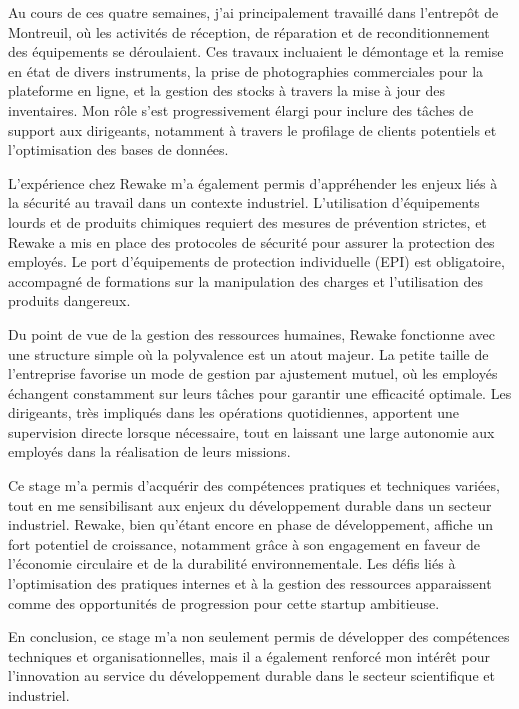 \documentclass{rapportENSCP}
\begin{document}
Au cours de ces quatre semaines, j’ai principalement travaillé dans l’entrepôt de Montreuil, où les activités de réception, de réparation et de reconditionnement des équipements se déroulaient. Ces travaux incluaient le démontage et la remise en état de divers instruments, la prise de photographies commerciales pour la plateforme en ligne, et la gestion des stocks à travers la mise à jour des inventaires. Mon rôle s’est progressivement élargi pour inclure des tâches de support aux dirigeants, notamment à travers le profilage de clients potentiels et l'optimisation des bases de données.

L’expérience chez Rewake m’a également permis d’appréhender les enjeux liés à la sécurité au travail dans un contexte industriel. L’utilisation d’équipements lourds et de produits chimiques requiert des mesures de prévention strictes, et Rewake a mis en place des protocoles de sécurité pour assurer la protection des employés. Le port d’équipements de protection individuelle (EPI) est obligatoire, accompagné de formations sur la manipulation des charges et l’utilisation des produits dangereux.

Du point de vue de la gestion des ressources humaines, Rewake fonctionne avec une structure simple où la polyvalence est un atout majeur. La petite taille de l’entreprise favorise un mode de gestion par ajustement mutuel, où les employés échangent constamment sur leurs tâches pour garantir une efficacité optimale. Les dirigeants, très impliqués dans les opérations quotidiennes, apportent une supervision directe lorsque nécessaire, tout en laissant une large autonomie aux employés dans la réalisation de leurs missions.

Ce stage m’a permis d’acquérir des compétences pratiques et techniques variées, tout en me sensibilisant aux enjeux du développement durable dans un secteur industriel. Rewake, bien qu’étant encore en phase de développement, affiche un fort potentiel de croissance, notamment grâce à son engagement en faveur de l’économie circulaire et de la durabilité environnementale. Les défis liés à l’optimisation des pratiques internes et à la gestion des ressources apparaissent comme des opportunités de progression pour cette startup ambitieuse.

En conclusion, ce stage m’a non seulement permis de développer des compétences techniques et organisationnelles, mais il a également renforcé mon intérêt pour l’innovation au service du développement durable dans le secteur scientifique et industriel.
\end{document}
